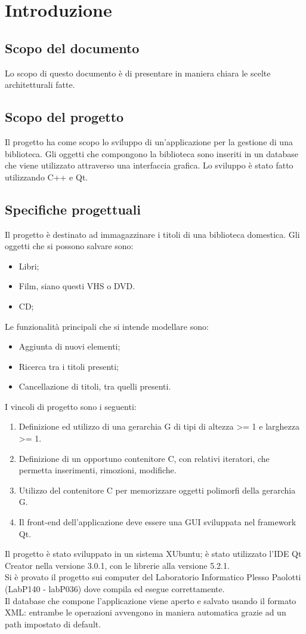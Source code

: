 \section{Introduzione}{
	\subsection{Scopo del documento}{
		Lo scopo di questo documento è di presentare in maniera chiara le scelte architetturali fatte.
	}
	\subsection{Scopo del progetto}{
		Il progetto ha come scopo lo sviluppo di un'applicazione per la gestione di una biblioteca. Gli oggetti che compongono la biblioteca sono inseriti in un database che viene utilizzato attraverso una interfaccia grafica.
		Lo sviluppo è stato fatto utilizzando C++ e Qt. 
	}
	\subsection{Specifiche progettuali}{
		Il progetto è destinato ad immagazzinare i titoli di una biblioteca domestica. Gli oggetti che si possono salvare sono:
		\begin{itemize}\itemsep0.5pt
			\item Libri;
			\item Film, siano questi  VHS o DVD.
			\item CD;
		\end{itemize}
		Le funzionalità principali che si intende modellare sono:
		\begin{itemize}\itemsep0.5pt
			\item Aggiunta di nuovi elementi;
			\item Ricerca tra i titoli presenti;
			\item Cancellazione di titoli, tra quelli presenti.
		\end{itemize}
		I vincoli di progetto sono i seguenti:
		\begin{enumerate}\itemsep0.5pt
			\item Definizione ed utilizzo di una gerarchia G di tipi di altezza >= 1 e larghezza >= 1.
			\item Definizione di un opportuno contenitore C, con relativi iteratori, che permetta inserimenti, rimozioni, modifiche.
			\item Utilizzo del contenitore C per memorizzare oggetti polimorfi della gerarchia G.
			\item Il front-end dell’applicazione deve essere una GUI sviluppata nel framework Qt.
		\end{enumerate}
		Il progetto è stato sviluppato in un sistema XUbuntu; è stato utilizzato l'IDE Qt Creator nella versione 3.0.1, con le librerie alla versione 5.2.1.	\\
		Si è provato il progetto sui computer del Laboratorio Informatico Plesso Paolotti (LabP140 - labP036) dove compila ed esegue correttamente.\\
		Il database che compone l'applicazione viene aperto e salvato usando il formato XML: entrambe le operazioni avvengono in maniera automatica grazie ad un path impostato di default. \\
	
}}
